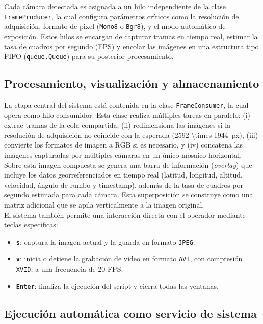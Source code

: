      Cada cámara detectada es asignada a un hilo independiente de la clase \texttt{FrameProducer}, la cual configura parámetros críticos como la resolución de adquisición, formato de pixel (\texttt{Mono8} o \texttt{Bgr8}), y el modo automático de exposición. Estos hilos se encargan de capturar tramas en tiempo real, estimar la tasa de cuadros por segundo (FPS) y encolar las imágenes en una estructura tipo FIFO (\texttt{queue.Queue}) para su posterior procesamiento.
    
    \subsection{Procesamiento, visualización y almacenamiento}
    
    La etapa central del sistema está contenida en la clase \texttt{FrameConsumer}, la cual opera como hilo consumidor. Esta clase realiza múltiples tareas en paralelo: (i) extrae tramas de la cola compartida, (ii) redimensiona las imágenes si la resolución de adquisición no coincide con la esperada (\SI[parse-numbers = false]{2592 \times 1944}{px}), (iii) convierte los formatos de imagen a RGB si es necesario, y (iv) concatena las imágenes capturadas por múltiples cámaras en un único mosaico horizontal.\\
    
    Sobre esta imagen compuesta se genera una barra de información (\textit{overlay}) que incluye los datos georreferenciados en tiempo real (latitud, longitud, altitud, velocidad, ángulo de rumbo y timestamp), además de la tasa de cuadros por segundo estimada para cada cámara. Esta superposición se construye como una matriz adicional que se apila verticalmente a la imagen original.\\
    
    El sistema también permite una interacción directa con el operador mediante teclas específicas:
    \begin{itemize}
        \item \textbf{\texttt{s}}: captura la imagen actual y la guarda en formato \texttt{JPEG}.
        \item \textbf{\texttt{v}}: inicia o detiene la grabación de video en formato \texttt{AVI}, con compresión \texttt{XVID}, a una frecuencia de 20 FPS.
        \item \textbf{\texttt{Enter}}: finaliza la ejecución del script y cierra todas las ventanas.
    \end{itemize}
    
    \subsection{Ejecución automática como servicio de sistema}
    
